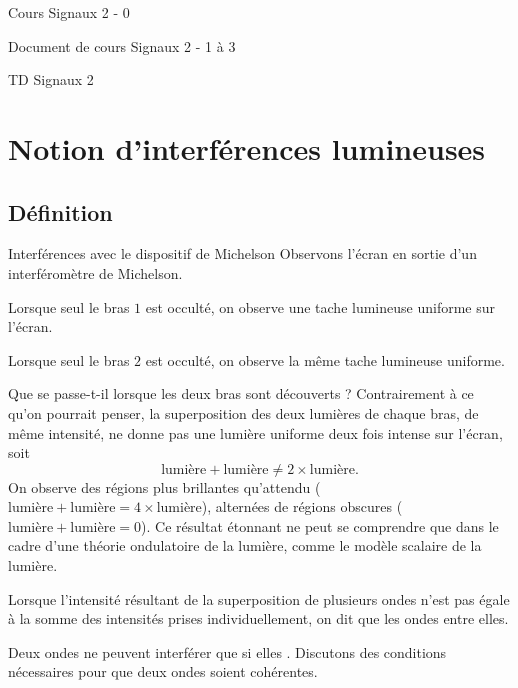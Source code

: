 \documentclass[12pt,fancy]{cours}
\begin{document}
{
\item Cours Signaux 2 - 0
\item Document de cours Signaux 2 - 1 à 3
\item TD Signaux 2
}

\section{Notion d’interférences lumineuses}

\subsection{Définition}
\begin{experience}{Interférences avec le dispositif de Michelson}\label{exp:}
  Observons l'écran en sortie d'un interféromètre de Michelson.
  \begin{liste}
    \item Lorsque seul le bras $1$  est occulté, on observe une tache lumineuse uniforme sur l'écran.
    \item Lorsque seul le bras $2$ est occulté, on observe la même tache lumineuse uniforme.
  \end{liste}
  Que se passe-t-il lorsque les deux bras sont découverts ? Contrairement à ce qu'on pourrait penser, la superposition des deux lumières de chaque bras, de même intensité, ne donne pas une lumière uniforme deux fois intense sur l'écran, soit 
\begin{equation}
\text{lumière}+\text{lumière} \neq 2\times\text{lumière}.
\end{equation}
On observe des régions plus brillantes qu'attendu ($
\text{lumière}+\text{lumière} =4\times\text{lumière}$), alternées de régions obscures ($\text{lumière}+\text{lumière} =0$).  Ce résultat étonnant ne peut se comprendre que dans le cadre d'une théorie  ondulatoire de la lumière, comme le modèle scalaire de la lumière.
\end{experience}


\begin{definition}[Interférences]\label{def:interferences}
Lorsque l'intensité résultant de la superposition de plusieurs ondes n'est pas égale à la somme des intensités prises individuellement, on dit que les ondes  entre elles.
\end{definition}
\noindent Deux ondes ne peuvent interférer que si elles . Discutons des conditions nécessaires pour que deux ondes soient cohérentes.
\end{document}
